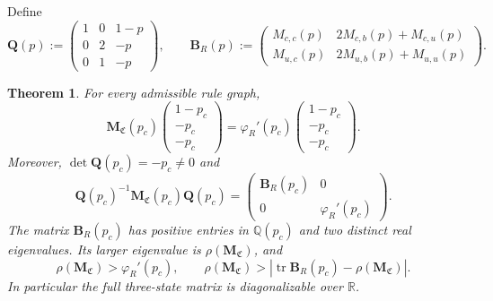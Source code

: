 \documentclass[scheme=plain,11pt]{ctexart}
\newtheorem{theorem}{Theorem}[section]
\theoremstyle{definition}
\theoremstyle{remark}
\begin{document}
Define
\[
 \mathbf Q(p):=
 \begin{pmatrix}
  1&0&1-p\\
  0&2&-p\\
  0&1&-p
 \end{pmatrix},
 \qquad
 \mathbf B_R(p):=
 \begin{pmatrix}
 M_{c,c}(p)&2M_{c,b}(p)+M_{c,u}(p)\\
 M_{u,c}(p)&2M_{u,b}(p)+M_{u,u}(p)
 \end{pmatrix}.
\]

\begin{theorem}\label{thm:three-state-block}
For every admissible rule graph,
\[
 \mathbf M_{\mathfrak C}(p_c)
 \begin{pmatrix}1-p_c\\-p_c\\-p_c\end{pmatrix}
 =\varphi_R'(p_c)
 \begin{pmatrix}1-p_c\\-p_c\\-p_c\end{pmatrix}.
\]
Moreover, $\det\mathbf Q(p_c)=-p_c\ne0$ and
\[
 \mathbf Q(p_c)^{-1}\mathbf M_{\mathfrak C}(p_c)\mathbf Q(p_c)
 =\begin{pmatrix}
   \mathbf B_R(p_c)&0\\
   0&\varphi_R'(p_c)
  \end{pmatrix}.
\]
The matrix $\mathbf B_R(p_c)$ has positive entries in $\mathbb Q(p_c)$ and two distinct real eigenvalues.
Its larger eigenvalue is $\rho(\mathbf M_{\mathfrak C})$, and
\[
 \rho(\mathbf M_{\mathfrak C})>\varphi_R'(p_c),
 \qquad
 \rho(\mathbf M_{\mathfrak C})>\left|\operatorname{tr}\mathbf B_R(p_c)-\rho(\mathbf M_{\mathfrak C})\right|.
\]
In particular the full three-state matrix is diagonalizable over $\mathbb R$.
\end{theorem}
\end{document}
